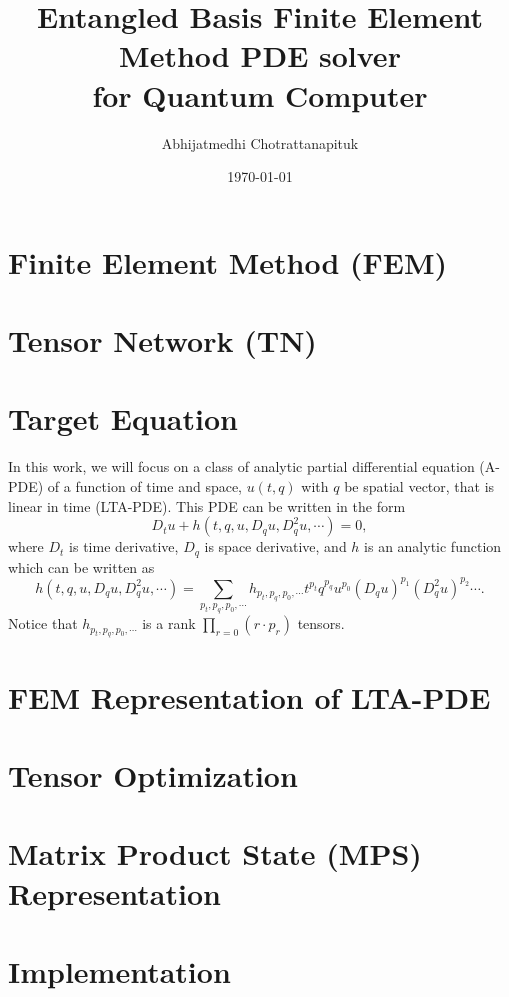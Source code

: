 \documentclass[preprint, 12pt]{revtex4-2}
\numberwithin{equation}{section}
\begin{document}
\title{Entangled Basis Finite Element Method PDE solver\\for Quantum Computer}

\author{Abhijatmedhi Chotrattanapituk}

\date{\today}

\maketitle
\section{Finite Element Method (FEM)}
\section{Tensor Network (TN)}
\section{Target Equation}
In this work, we will focus on a class of analytic partial differential equation (A-PDE) of a function of time and space, $u(t, q)$ with $q$ be spatial vector, that is linear in time (LTA-PDE). This PDE can be written in the form
\begin{equation}
    D_tu + h\left(t, q, u, D_qu, D_q^2u, \cdots \right) = 0,
\end{equation}
where $D_t$ is time derivative, $D_q$ is space derivative, and $h$ is an analytic function which can be written as
\begin{equation}
    h\left(t, q, u, D_qu, D_q^2u, \cdots\right) = \sum_{p_t, p_q, p_0,\cdots}h_{p_t, p_q, p_0,\cdots}t^{p_t}q^{p_q}u^{p_0}\left(D_qu\right)^{p_1}\left(D_q^2u\right)^{p_2}\cdots.
\end{equation}
Notice that $h_{p_t, p_q, p_0,\cdots}$ is a rank $\prod_{r=0} (r\cdot p_r)$ tensors.
\section{FEM Representation of LTA-PDE}
\section{Tensor Optimization}
\section{Matrix Product State (MPS) Representation}
\section{Implementation}
\end{document}
